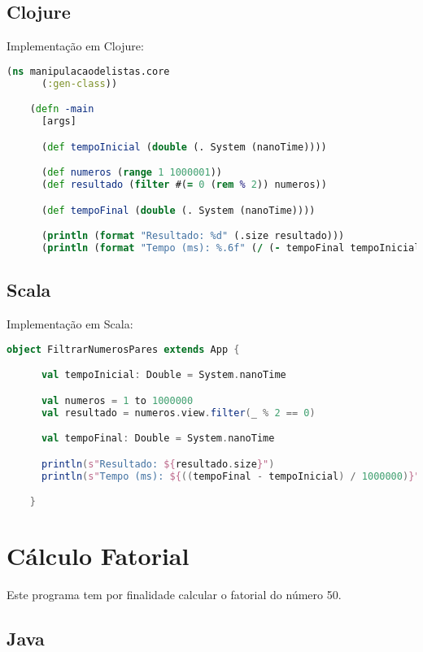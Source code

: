   \subsection{Clojure}

    Implementação em Clojure:

    \begin{lstlisting}[language=Clojure, mathescape=false]
    (ns manipulacaodelistas.core
      (:gen-class))

    (defn -main
      [args]

      (def tempoInicial (double (. System (nanoTime))))

      (def numeros (range 1 1000001))
      (def resultado (filter #(= 0 (rem % 2)) numeros))

      (def tempoFinal (double (. System (nanoTime))))

      (println (format "Resultado: %d" (.size resultado)))
      (println (format "Tempo (ms): %.6f" (/ (- tempoFinal tempoInicial) 1000000))))
    \end{lstlisting}

  \subsection{Scala}

    Implementação em Scala:

    \begin{lstlisting}[language=Scala, mathescape=false]
    object FiltrarNumerosPares extends App {

      val tempoInicial: Double = System.nanoTime

      val numeros = 1 to 1000000
      val resultado = numeros.view.filter(_ % 2 == 0)

      val tempoFinal: Double = System.nanoTime

      println(s"Resultado: ${resultado.size}")
      println(s"Tempo (ms): ${((tempoFinal - tempoInicial) / 1000000)}")

    }
    \end{lstlisting}

\section{Cálculo Fatorial}

  Este programa tem por finalidade calcular o fatorial do número 50.

  \subsection{Java}

